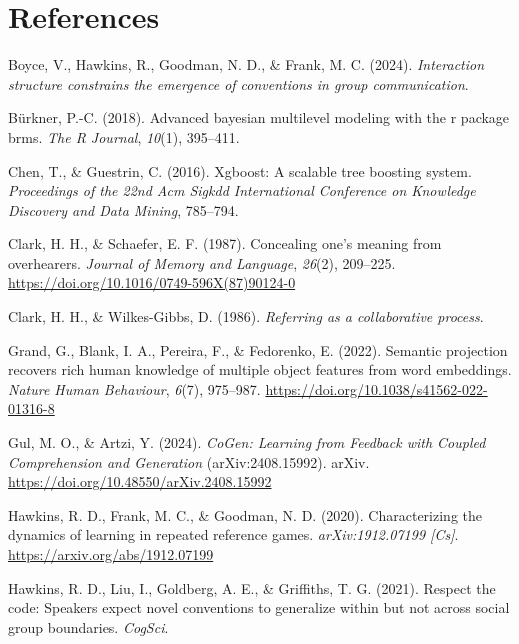 \documentclass[10pt, letterpaper]{article}
\begin{document}
\section{References}\label{references}

\setlength{\parindent}{-0.1in} 
\setlength{\leftskip}{0.125in}

\noindent

\label{refs}
\begin{CSLReferences}{1}{0}
Boyce, V., Hawkins, R., Goodman, N. D., \& Frank, M. C. (2024).
\emph{Interaction structure constrains the emergence of conventions in
group communication}.

Bürkner, P.-C. (2018). Advanced bayesian multilevel modeling with the r
package brms. \emph{The R Journal}, \emph{10}(1), 395--411.

Chen, T., \& Guestrin, C. (2016). Xgboost: {A} scalable tree boosting
system. \emph{Proceedings of the 22nd Acm Sigkdd International
Conference on Knowledge Discovery and Data Mining}, 785--794.

Clark, H. H., \& Schaefer, E. F. (1987). Concealing one's meaning from
overhearers. \emph{Journal of Memory and Language}, \emph{26}(2),
209--225. \url{https://doi.org/10.1016/0749-596X(87)90124-0}

Clark, H. H., \& Wilkes-Gibbs, D. (1986). \emph{Referring as a
collaborative process}.

Grand, G., Blank, I. A., Pereira, F., \& Fedorenko, E. (2022). Semantic
projection recovers rich human knowledge of multiple object features
from word embeddings. \emph{Nature Human Behaviour}, \emph{6}(7),
975--987. \url{https://doi.org/10.1038/s41562-022-01316-8}

Gul, M. O., \& Artzi, Y. (2024). \emph{{CoGen}: {Learning} from
{Feedback} with {Coupled Comprehension} and {Generation}}
(arXiv:2408.15992). arXiv.
\url{https://doi.org/10.48550/arXiv.2408.15992}

Hawkins, R. D., Frank, M. C., \& Goodman, N. D. (2020). Characterizing
the dynamics of learning in repeated reference games.
\emph{arXiv:1912.07199 {[}Cs{]}}. \url{https://arxiv.org/abs/1912.07199}

Hawkins, R. D., Liu, I., Goldberg, A. E., \& Griffiths, T. G. (2021).
Respect the code: {Speakers} expect novel conventions to generalize
within but not across social group boundaries. \emph{CogSci}.


\end{CSLReferences}
\end{document}
